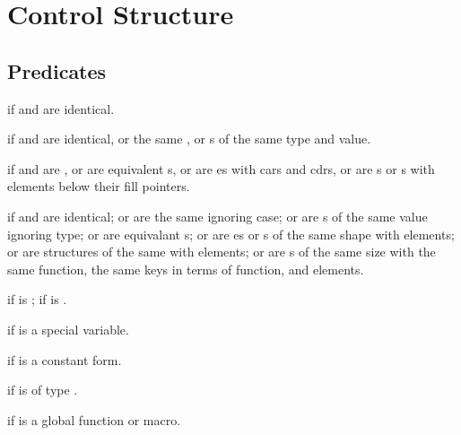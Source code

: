 %
%

\section{Control Structure}

\subsection{Predicates}
\begin{LIST}{1cm}

  {
  \retval{\T} if  and  are identical.
  }

  {
  \retval{\T} if  and 
  are identical, or the same , or s of the
  same type and value. 
  }

  {
  \retval{\T} if  and 
  are , or are equivalent s, or are es with
   cars and cdrs, or are s or s with
   elements below their fill pointers.
  }

  {
  \retval{\T} if  and  are identical; or are the
  same  ignoring case; or are s of the same
  value ignoring type; or are equivalant s; or are
  es or s of the same shape with 
  elements; or are structures of the same  with
   elements; or are s of the same size
  with the same  function, the same keys in terms of
   function, and  elements.
  }

  {
  \retval{\NIL} if  is \T; \retval{\T} if  is \NIL.
  }

  {
  \retval{\T} if  is a special variable.
  }

  {
  \retval{\T} if  is a constant form.
  }

  {
  \retval{\T} if  is of type .
  }

  {
  \retval{\T} if  is a global function or macro.
  }


\end{LIST}


